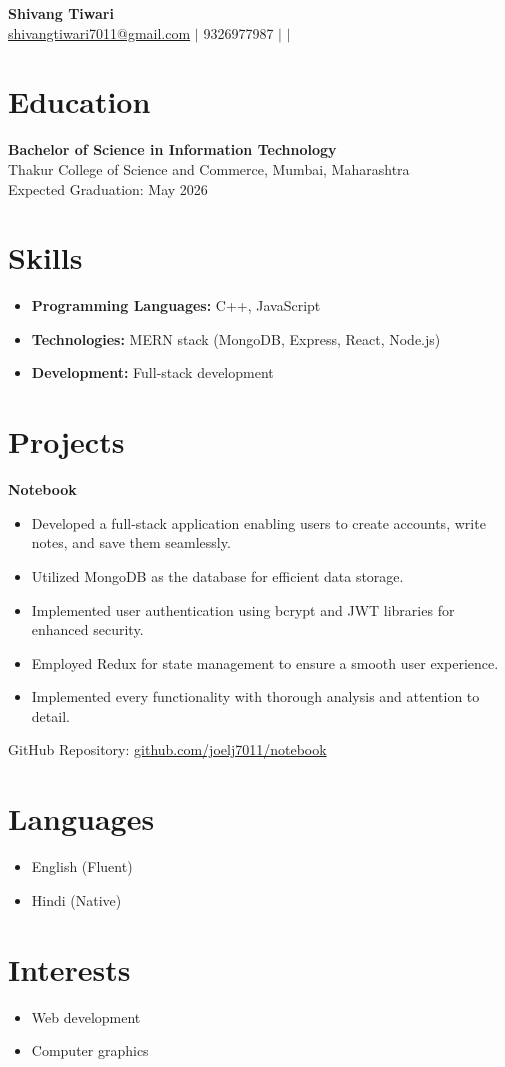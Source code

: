 \documentclass{article}
\newcommand{\email}[1]{\href{mailto:#1}{#1}}
\newcommand{\github}[1]{\href{https://github.com/#1}{\textcolor{darkblue}{\faGithub}}}
\newcommand{\linkedin}[1]{\href{https://www.linkedin.com/in/#1}{\textcolor{darkblue}{\faLinkedin}}}
\begin{document}
\begin{center}
    {\Huge\bfseries Shivang Tiwari}\\
    \vspace{0.1in}
    \email{shivangtiwari7011@gmail.com} $\vert$ 9326977987 $\vert$ \linkedin{shivang-tiwari-364342297} $\vert$ \github{joelj7011}
\end{center}

\section*{Education}
\textbf{Bachelor of Science in Information Technology}\\
Thakur College of Science and Commerce, Mumbai, Maharashtra\\
Expected Graduation: May 2026

\section*{Skills}
\begin{itemize}[leftmargin=*]
    \item \textbf{Programming Languages:} C++, JavaScript
    \item \textbf{Technologies:} MERN stack (MongoDB, Express, React, Node.js)
    \item \textbf{Development:} Full-stack development
\end{itemize}

\section*{Projects}
\textbf{Notebook}
\begin{itemize}[leftmargin=*]
    \item Developed a full-stack application enabling users to create accounts, write notes, and save them seamlessly.
    \item Utilized MongoDB as the database for efficient data storage.
    \item Implemented user authentication using bcrypt and JWT libraries for enhanced security.
    \item Employed Redux for state management to ensure a smooth user experience.
    \item Implemented every functionality with thorough analysis and attention to detail.
\end{itemize}
GitHub Repository: \href{https://github.com/joelj7011/notebook}{github.com/joelj7011/notebook}


\section*{Languages}
\begin{itemize}[leftmargin=*]
    \item English (Fluent)
    \item Hindi (Native)
\end{itemize}

\section*{Interests}
\begin{itemize}[leftmargin=*]
    \item Web development
    \item Computer graphics
\end{itemize}
\end{document}
